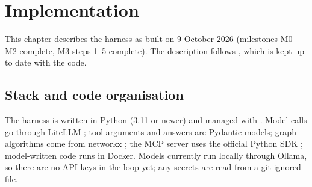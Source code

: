 \chapter{Implementation}
\label{ch:impl}

This chapter describes the harness as built on 9 October 2026 (milestones M0--M2 complete, M3 steps 1--5 complete).
The description follows , which is kept up to date with the code.

\section{Stack and code organisation}

The harness is written in Python (3.11 or newer) and managed with . Model calls go through LiteLLM
\cite{litellm}; tool arguments and answers are Pydantic models; graph algorithms come from networkx \cite{networkx};
the MCP server uses the official  Python SDK \cite{mcp}; model-written code runs in Docker. Models currently
run locally through Ollama, so there are no API keys in the loop yet; any secrets are read from a git-ignored
 file.

